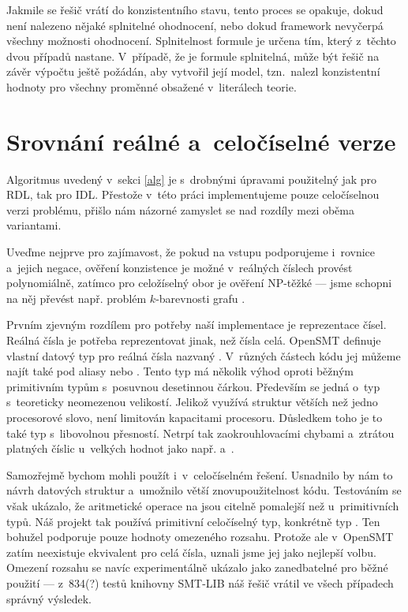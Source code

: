 Jakmile se řešič vrátí do konzistentního stavu, tento proces se opakuje, dokud není nalezeno nějaké splnitelné ohodnocení, nebo dokud framework nevyčerpá všechny možnosti ohodnocení. Splnitelnost formule je určena tím, který z~těchto dvou případů nastane. V~případě, že je formule splnitelná, může být řešič na závěr výpočtu ještě požádán, aby vytvořil její model, tzn.~nalezl konzistentní hodnoty pro všechny proměnné obsažené v~literálech teorie.

\section{Srovnání reálné a~celočíselné verze} \label{int_v_real}

Algoritmus uvedený v~sekci \ref{alg} je s~drobnými úpravami použitelný jak pro RDL, tak pro IDL. Přestože v~této práci implementujeme pouze celočíselnou verzi problému, přišlo nám názorné zamyslet se nad rozdíly mezi oběma variantami.

Uveďme nejprve pro zajímavost, že pokud na vstupu podporujeme i~rovnice a~jejich negace, ověření konzistence je možné v~reálných číslech provést polynomiálně, zatímco pro celožíselný obor je ověření NP-těžké --- jsme schopni na něj převést např. problém $k$-barevnosti grafu \cite{slides}.

Prvním zjevným rozdílem pro potřeby naší implementace je reprezentace čísel. Reálná čísla je potřeba reprezentovat jinak, než čísla celá. OpenSMT definuje vlastní datový typ pro reálná čísla nazvaný . V~různých částech kódu jej můžeme najít také pod aliasy  nebo . Tento typ má několik výhod oproti běžným primitivním typům s~posuvnou desetinnou čárkou. Především se jedná o~typ s~teoreticky neomezenou velikostí. Jelikož využívá struktur větších než jedno procesorové slovo, není limitován kapacitami procesoru. Důsledkem toho je to také typ s~libovolnou přesností. Netrpí tak zaokrouhlovacími chybami a~ztrátou platných číslic u~velkých hodnot jako např.  a~.

Samozřejmě bychom mohli  použít i~v~celočíselném řešení. Usnadnilo by nám to návrh datových struktur a~umožnilo větší znovupoužitelnost kódu. Testováním se však ukázalo, že aritmetické operace na  jsou citelně pomalejší než u~primitivních typů. Náš projekt tak používá primitivní celočíselný typ, konkrétně typ . Ten bohužel podporuje pouze hodnoty omezeného rozsahu. Protože ale v~OpenSMT zatím neexistuje ekvivalent  pro celá čísla, uznali jsme jej jako nejlepší volbu. Omezení rozsahu se navíc experimentálně ukázalo jako zanedbatelné pro běžné použití --- z~834(?) %
testů knihovny SMT-LIB náš řešič vrátil ve všech případech správný výsledek.

